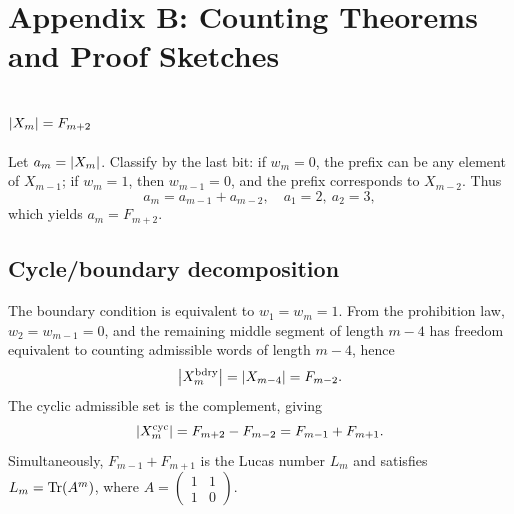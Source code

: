 \section{Appendix B: Counting Theorems and Proof Sketches}

\subsection{\texorpdfstring{$\left\lvert X_m\right\rvert=F_{m+2}$}{|X\_m| = F\_{m+2}}}

Let $a_m=\left\lvert X_m\right\rvert$. Classify by the last bit: if $w_m=0$, the prefix can be any element of $X_{m-1}$; if $w_m=1$, then $w_{m-1}=0$, and the prefix corresponds to $X_{m-2}$. Thus
\[
a_m=a_{m-1}+a_{m-2},\quad a_1=2,\ a_2=3,
\]
which yields $a_m=F_{m+2}$.

\subsection{Cycle/boundary decomposition}

The boundary condition is equivalent to $w_1=w_m=1$. From the prohibition law, $w_2=w_{m-1}=0$, and the remaining middle segment of length $m-4$ has freedom equivalent to counting admissible words of length $m-4$, hence
\[
\left\lvert X_m^{\mathrm{bdry}}\right\rvert=\left\lvert X_{m-4}\right\rvert=F_{m-2}.
\]
The cyclic admissible set is the complement, giving
\[
\left\lvert X_m^{\mathrm{cyc}}\right\rvert=F_{m+2}-F_{m-2}=F_{m-1}+F_{m+1}.
\]
Simultaneously, $F_{m-1}+F_{m+1}$ is the Lucas number $L_m$ and satisfies $L_m=\mathrm{Tr}(A^m)$, where $A=\begin{pmatrix}1&1\\1&0\end{pmatrix}$.
